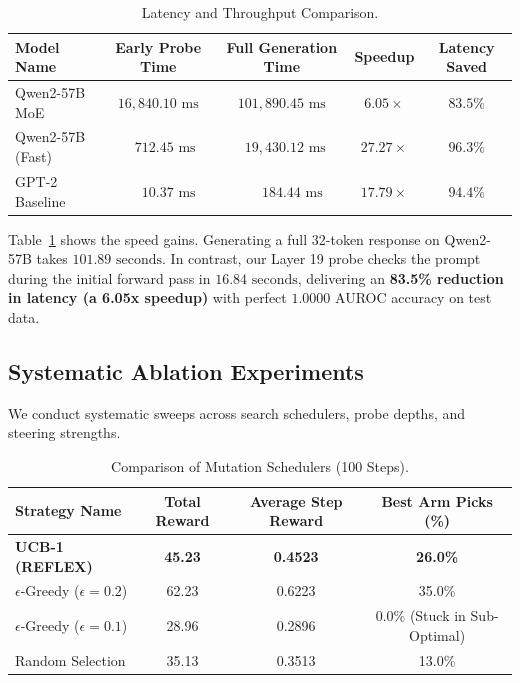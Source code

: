 \documentclass[manuscript,screen,review,anonymous]{acmart}
\begin{document}
\begin{table}[t]
  \caption{Latency and Throughput Comparison.}
  \label{tab:latency_benchmarks}
  \begin{tabular}{lcccc}
    \toprule
    Model Name & Early Probe Time & Full Generation Time & Speedup & Latency Saved \\
    \midrule
    Qwen2-57B MoE    & $16,840.10\text{ ms}$ & $101,890.45\text{ ms}$ & $6.05\times$  & $83.5\%$ \\
    Qwen2-57B (Fast) & $\phantom{00}712.45\text{ ms}$  & $\phantom{0}19,430.12\text{ ms}$ & $27.27\times$ & $96.3\%$ \\
    GPT-2 Baseline   & $\phantom{000}10.37\text{ ms}$   & $\phantom{000}184.44\text{ ms}$  & $17.79\times$ & $94.4\%$ \\
    \bottomrule
  \end{tabular}
\end{table}

Table~\ref{tab:latency_benchmarks} shows the speed gains. Generating a full 32-token response on Qwen2-57B takes $101.89\text{ seconds}$. In contrast, our Layer 19 probe checks the prompt during the initial forward pass in $16.84\text{ seconds}$, delivering an \textbf{83.5\% reduction in latency (a 6.05x speedup)} with perfect $1.0000$ AUROC accuracy on test data.

\subsection{Systematic Ablation Experiments}
We conduct systematic sweeps across search schedulers, probe depths, and steering strengths.

\begin{table}[t]
  \caption{Comparison of Mutation Schedulers (100 Steps).}
  \label{tab:bandit_ablation}
  \begin{tabular}{lccc}
    \toprule
    Strategy Name & Total Reward & Average Step Reward & Best Arm Picks (\%) \\
    \midrule
    \textbf{UCB-1 (REFLEX)} & \textbf{45.23} & \textbf{0.4523} & \textbf{26.0\%} \\
    $\epsilon$-Greedy ($\epsilon=0.2$) & 62.23 & 0.6223 & 35.0\% \\
    $\epsilon$-Greedy ($\epsilon=0.1$) & 28.96 & 0.2896 & \phantom{0}0.0\% (Stuck in Sub-Optimal) \\
    Random Selection & 35.13 & 0.3513 & 13.0\% \\
    \bottomrule
  \end{tabular}
\end{table}
\end{document}
